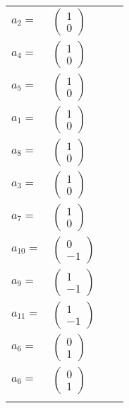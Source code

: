 \documentclass[1p]{elsarticle_modified}
\theoremstyle{definition}
\begin{document}
\begin{tabular}{m{7pt} m{180pt} m{7pt} m{180pt} }
\flushright $a_{2}=$&$\begin{pmatrix}1\\0\end{pmatrix}$ \\
\flushright $a_{4}=$&$\begin{pmatrix}1\\0\end{pmatrix}$ \\
\flushright $a_{5}=$&$\begin{pmatrix}1\\0\end{pmatrix}$ \\
\flushright $a_{1}=$&$\begin{pmatrix}1\\0\end{pmatrix}$ \\
\flushright $a_{8}=$&$\begin{pmatrix}1\\0\end{pmatrix}$ \\
\flushright $a_{3}=$&$\begin{pmatrix}1\\0\end{pmatrix}$ \\
\flushright $a_{7}=$&$\begin{pmatrix}1\\0\end{pmatrix}$ \\
\flushright $a_{10}=$&$\begin{pmatrix}0\\-1\end{pmatrix}$ \\
\flushright $a_{9}=$&$\begin{pmatrix}1\\-1\end{pmatrix}$ \\
\flushright $a_{11}=$&$\begin{pmatrix}1\\-1\end{pmatrix}$ \\
\flushright $a_{6}=$&$\begin{pmatrix}0\\1\end{pmatrix}$\\ \flushright $a_{6}=$&$\begin{pmatrix}0\\1\end{pmatrix}$\\&\end{tabular}
\end{document}
